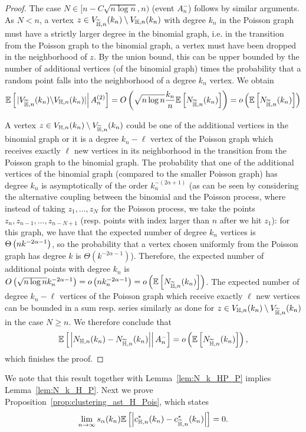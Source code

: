 \begin{proof}
The case $N \in [n-C\sqrt{n\log n},n)$ (event $A_n^{-}$) follows by similar arguments. As $N < n$, a vertex $z \in V_{\widetilde{\mathbb{H}},n}(k_n) \setminus V_{\mathbb{H},n}(k_n)$ with degree $k_n$ in the Poisson graph must have a strictly larger degree in the binomial graph, i.e. in the transition from the Poisson graph to the binomial graph, a vertex must have been dropped in the neighborhood of $z$. By the union bound, this can be upper bounded by the number of additional vertices (of the binomial graph) times the probability that a random point falls into the neighborhood of a degree $k_n$ vertex. We obtain
\begin{align*}
	\mathbb{E}\left[\left.|V_{\widetilde{\mathbb{H}},n}(k_n) \backslash V_{\mathbb{H},n}(k_n)|\right|A_n^{(2)}\right] = O\left( \sqrt{n\log n}\frac{k_n}{n} \mathbb{E}\left[N_{\widetilde{\mathbb{H}},n}(k_n)\right] \right)
	= o\left(\mathbb{E}\left[N_{\widetilde{\mathbb{H}},n}(k_n)\right]\right)
\end{align*}

A vertex $z \in V_{\mathbb{H},n}(k_n) \setminus V_{\widetilde{\mathbb{H}},n}(k_n)$ could be one of the additional vertices in the binomial graph or it is a degree $k_n-\ell$ vertex of the Poisson graph which receives exactly $\ell$ new vertices in its neighborhood in the transition from the Poisson graph to the binomial graph. The probability that one of the additional vertices of the binomial graph (compared to the smaller Poisson graph) has degree $k_n$ is asymptotically of the order $k_n^{-(2\alpha+1)}$ (as can be seen by considering the alternative coupling between the binomial and the Poisson process, where instead of taking $z_1, \dots, z_N$ for the Poisson process, we take the points $z_n, z_{n-1}, \dots, z_{n-N+1}$ (resp. points with index larger than $n$ after we hit $z_1$): for this graph, we have that the expected number of degree $k_n$ vertices is $\Theta\left(n k^{-2\alpha-1}\right)$, so the probability that a vertex chosen uniformly from the Poisson graph has degree $k$ is $\Theta(k^{-2\alpha-1})$). Therefore, the expected number of additional points with degree $k_n$ is $O\left(\sqrt{n\log n} k_n^{-2\alpha-1}\right) = o\left(n k_n^{-2\alpha-1}\right) = o\left(\mathbb{E}\left[N_{\widetilde{\mathbb{H}},n}(k_n)\right]\right)$. The expected number of degree $k_n-\ell$ vertices of the Poisson graph which receive exactly $\ell$ new vertices can be bounded in a sum resp. series similarly as done for $z \in V_{\mathbb{H},n}(k_n) \setminus V_{\widetilde{\mathbb{H}},n}(k_n)$ in the case $N \geq n$. We therefore conclude that
\[
	\mathbb{E}\left[\left.\left|N_{\mathbb{H},n}(k_n)-N_{\widetilde{\mathbb{H}},n}(k_n)\right|\right|A_n^{-}\right] = o\left(\mathbb{E}\left[N_{\widetilde{\mathbb{H}},n}(k_n)\right]\right),
\]
which finishes the proof.
\end{proof}

We note that this result together with Lemma~\ref{lem:N_k_HP_P} implies Lemma~\ref{lem:N_k_H_P}. Next we prove Proposition~\ref{prop:clustering_ast_H_Pois}, which states
\[
	\lim_{n \to \infty} s_\alpha(k_n)\mathbb{E}\left[\left|c_{\mathbb{H},n}^\ast(k_n) - c_{\widetilde{\mathbb{H}},n}^\ast(k_n)\right|\right] = 0.
\]

